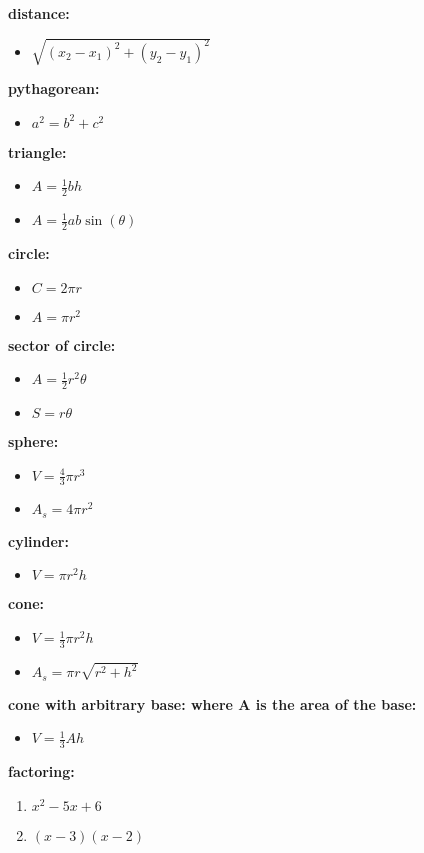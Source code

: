 \documentclass{article}
\begin{document}
\textbf{distance:}	
	\begin{itemize}
		\item $\sqrt{(x_2 - x_1)^2 + (y_2 - y_1)^2}$
	\end{itemize}	

\textbf{pythagorean:}
	\begin{itemize}
		\item $a^2 = b^2 + c^2$
	\end{itemize}

\textbf{triangle:}
	\begin{itemize}
		\item $A = \frac{1}{2}bh$
		\item $A = \frac{1}{2}ab\sin(\theta)$
	\end{itemize}

\textbf{circle:}	
	\begin{itemize}	
		\item $C = 2\pi r$
		\item $A = \pi r^2$ 
	\end{itemize}

\textbf{sector of circle:}
	\begin{itemize}
		\item $A = \frac{1}{2}r^2\theta$
		\item $S = r\theta$
	\end{itemize}

\textbf{sphere:}
	\begin{itemize}
		\item $V = \frac{4}{3}\pi r^3$
		\item $A_s = 4\pi r^2$
	\end{itemize}

\textbf{cylinder:}
	\begin{itemize}
		\item $V = \pi r^2h$
	\end{itemize}

\textbf{cone:}
	\begin{itemize}
		\item $V = \frac{1}{3}\pi r^2h$
		\item $A_s = \pi r\sqrt{r^2+h^2}$
	\end{itemize}

\textbf{cone with arbitrary base: where A is the area of the base:}
	\begin{itemize}
		\item $V = \frac{1}{3}Ah$
	\end{itemize}

\textbf{factoring:}
	\begin{enumerate}
		\item $x^2 - 5x + 6$
		\item $(x - 3)(x - 2)$
	\end{enumerate}
\end{document}
